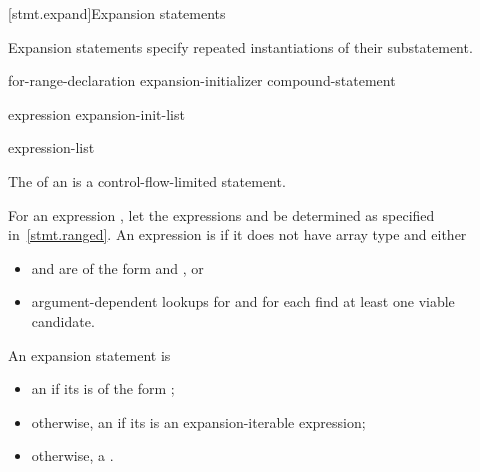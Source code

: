 
[stmt.expand]{Expansion statements}

\pnum
Expansion statements specify repeated instantiations
of their substatement.

\begin{bnf}
\br
      \terminal{(}
         for-range-declaration \terminal{:}
        expansion-initializer \terminal{)} compound-statement
\end{bnf}

\begin{bnf}
\br
    expression\br
    expansion-init-list
\end{bnf}

\begin{bnf}
\br
    \terminal{\{} expression-list \opt{\terminal{,}} \terminal{\}}\br
    \terminal{\{} \terminal{\}}
\end{bnf}

\pnum
The  of an 
is a control-flow-limited statement.

\pnum
For an expression , let the expressions
 and  be determined as specified in~\ref{stmt.ranged}.
An expression is  if it does not have array type and either
\begin{itemize}
\item
{} and  are of the form
 and , or
\item
argument-dependent lookups for  and for 
each find at least one viable candidate.
\end{itemize}

\pnum
An expansion statement is
\begin{itemize}
\item
an  if its 
is of the form ;
\item
otherwise, an  if its 
is an expansion-iterable expression;
\item
otherwise, a .
\end{itemize}


